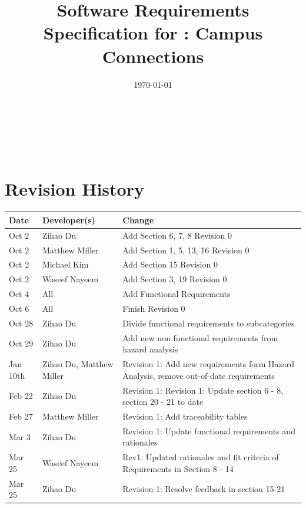 \documentclass[12pt]{article}
\begin{document}

\title{Software Requirements Specification for \progname: Campus Connections} 
\author{\authname}
\date{\today}
	
\maketitle

~\newpage


\tableofcontents

~\newpage

\section*{Revision History}

\begin{tabularx}{\textwidth}{p{3cm}p{3cm}X}
\toprule {\textbf{Date}} & {\textbf{Developer(s)}} & {\textbf{Change}}\\
\midrule
Oct 2 & Zihao Du & Add Section 6, 7, 8 Revision 0\\
Oct 2 & Matthew Miller & Add Section 1, 5, 13, 16 Revision 0\\
Oct 2 & Michael Kim & Add Section 15 Revision 0\\
Oct 2 & Waseef Nayeem & Add Section 3, 19 Revision 0\\
Oct 4 & All & Add Functional Requirements\\
Oct 6 & All & Finish Revision 0\\
Oct 28 & Zihao Du & Divide functional requirements to subcategories\\
Oct 29 & Zihao Du & Add new non functional requirements from hazard analysis\\
Jan 10th & Zihao Du, Matthew Miller & Revision 1: Add new requirements form Hazard Analysis, remove out-of-date requirements\\
Feb 22 & Zihao Du & Revision 1: Revision 1: Update section 6 - 8, section 20 - 21 to date\\
Feb 27 & Matthew Miller & Revision 1: Add traceability tables\\
Mar 3 & Zihao Du & Revision 1: Update functional requirements and rationales\\
Mar 25 & Waseef Nayeem & Rev1: Updated rationales and fit criteria of Requirements in Section 8 - 14\\
Mar 25 & Zihao Du & Revision 1: Resolve feedback in section 15-21\\
\bottomrule
\end{tabularx}
\end{document}
